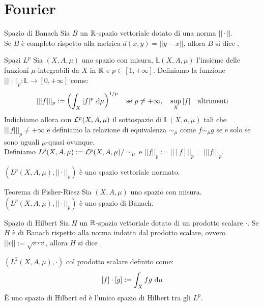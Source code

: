 \documentclass{article}
\begin{document}
\section{Fourier}

\begin{definition}{Spazio di Banach}{}
    Sia $B$ un $\mathbb{R}$-spazio vettoriale dotato di una norma $||\cdot||$.\\
    Se $B$ è completo rispetto alla metrica $d(x,y) = ||y-x||$, allora $B$ si dice .
\end{definition}

\begin{definition}{Spazi $L^p$}{}
    Sia $(X,A,\mu)$ uno spazio con misura, $\mathbb{L}(X,A,\mu)$ l'insieme delle funzioni $\mu$-integrabili da $X$ in $\mathbb{R}$ e $p \in [1,+\infty]$. Definiamo la funzione $|||\cdot|||_p : \mathbb{L}\to[0,+\infty]$ come:
    \[|||f|||_p := \left(\int_X |f|^p \text{ d} \mu\right)^{1/p} \quad \text{se } p \neq +\infty, \quad \sup_X |f| \quad \text{altrimenti}\]    
    Indichiamo allora con $\mathcal{L}^p(X,A,\mu)$ il sottospazio di $\mathbb{L}(X,a,\mu)$ tali che $|||f|||_p \neq +\infty$ e definiamo la relazione di equivalenza $\sim_\mu$ come $f\sim_\mu g$ se e solo se sono uguali $\mu$-quasi ovunque.\\
    Definiamo $L^p(X,A,\mu) := \mathcal{L}^p(X,A,\mu)/\sim_\mu$ e $||f||_p := ||[f]||_p = |||f|||_p$.
\end{definition}

\begin{remark}{}{}
    $(L^p(X,A,\mu),||\cdot||_p)$ è uno spazio vettoriale normato.
\end{remark}

\begin{theorem}{Teorema di Fisher-Riesz}{}
    Sia $(X,A,\mu)$ uno spazio con misura.\\
     $(L^p(X,A,\mu), ||\cdot||_p)$ è uno spazio di Banach.
\end{theorem}

\begin{definition}{Spazio di Hilbert}{}
    Sia $H$ un $\mathbb{R}$-spazio vettoriale dotato di un prodotto scalare $\cdot$. Se $H$ è di Banach rispetto alla norma indotta dal prodotto scalare, ovvero $||v|| := \sqrt{v\cdot v}$, allora $H$ si dice .
\end{definition}

\begin{proposition}{}{}
    $(L^2(X,A,\mu), \cdot)$ col prodotto scalare definito come:
    \[[f] \cdot [g] := \int_X f g \text{ d} \mu\]
    È uno spazio di Hilbert ed è l'unico spazio di Hilbert tra gli $L^p$.
\end{proposition}
\end{document}
